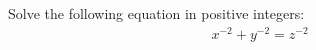 Solve the following equation in positive integers:
\begin{align*}
x^{-2} + y^{-2} = z^{-2}
\end{align*}
